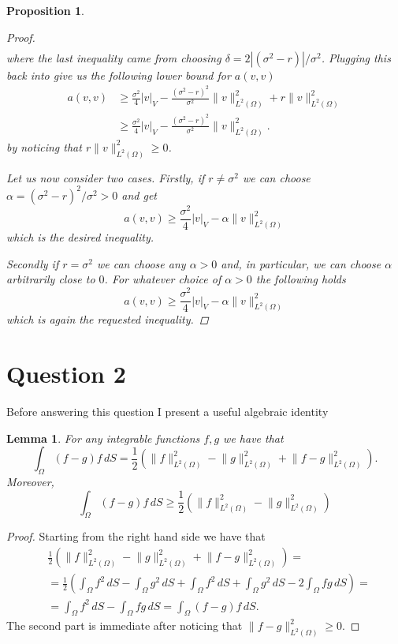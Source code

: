 \documentclass{article}
\newtheorem{lemma}[thm]{Lemma}
\newtheorem{prop}[thm]{Proposition}
\newcommand{\intS}[1]{\ensuremath{\int_{\Omega}#1 \, dS}}
\newcommand{\seminorm}[1]{\ensuremath{|#1|_V}}
\newcommand{\normsq}[1]{\ensuremath{\|#1\|_{L^2(\Omega)}^2}}
\begin{document}
\begin{prop}
\begin{proof}
\begin{align*}
        \end{align*}
        where the last inequality came from choosing $\delta = 2| (\sigma^2 - r) | / \sigma^2$. Plugging this back into  give us the following lower bound for $a(v,v)$
        \begin{align*}
            a(v,v) &\geq \frac{\sigma^2}{4} \seminorm{v} - \frac{(\sigma^2 - r)^2}{ \sigma^2} \normsq{v} + r \normsq{v}\\
            &\geq \frac{\sigma^2}{4} \seminorm{v} - \frac{(\sigma^2 - r)^2}{ \sigma^2} \normsq{v}.
        \end{align*}
        by noticing that $r \normsq{v} \geq 0$.
        
        Let us now consider two cases. Firstly, if $r \neq \sigma^2$ we can choose $\alpha = (\sigma^2 - r)^2 / \sigma^2 > 0$ and get
        \begin{equation*}
            a(v,v) \geq \frac{\sigma^2}{4} \seminorm{v} - \alpha \normsq{v}
        \end{equation*}
        which is the desired inequality.

        Secondly if $r = \sigma^2$ we can choose any $\alpha >0$ and, in particular, we can choose $\alpha$ arbitrarily close to $0$. For whatever choice of $\alpha > 0$ the following holds
        \begin{equation*}
            a(v,v) \geq \frac{\sigma^2}{4} \seminorm{v} - \alpha \normsq{v}
        \end{equation*}
        which is again the requested inequality.
    \end{proof}
\end{prop}

\section{Question 2}
Before answering this question I present a useful algebraic identity
\begin{lemma}\label{lemma_alg_id_and_ineq}
    For any integrable functions $f, g$ we have that
    \begin{equation*}
        \intS{(f - g)f} = \frac{1}{2}\left( \normsq{f} - \normsq{g} + \normsq{f - g}\right).
    \end{equation*}
    Moreover,
    $$\intS{(f - g)f} \geq \frac{1}{2}\left( \normsq{f} - \normsq{g} \right)$$
\end{lemma}
\begin{proof}
    Starting from the right hand side we have that
    \begin{align*}
        &\frac{1}{2}\left( \normsq{f} - \normsq{g} + \normsq{f - g}\right) =\\
        &=\frac{1}{2}\left(\intS{f^2} -  \intS{g^2} + \intS{f^2} +  \intS{g^2} - 2\intS{fg} \right) =\\
        &=\intS{f^2} - \intS{fg} = \intS{(f - g)f}.
    \end{align*}
    The second part is immediate after noticing that $\normsq{f - g} \geq 0$.
\end{proof}
\end{document}
